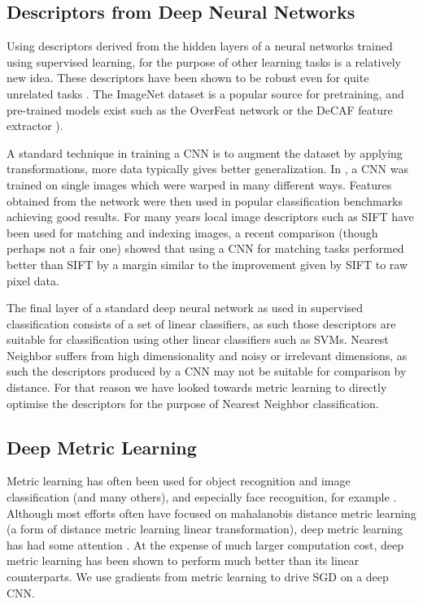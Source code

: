 \subsection {Descriptors from Deep Neural Networks}

Using descriptors derived from the hidden layers of a neural networks trained using supervised learning, for the purpose of other learning tasks is a relatively new idea. These descriptors have been shown to be robust even for quite unrelated tasks \cite{Donahue2014,Razavian2014}. The ImageNet dataset \cite{Krizhevsky2012} is a popular source for pretraining, and pre-trained models exist such as the OverFeat network \cite{Sermanet2013} or the DeCAF feature extractor \cite{Donahue2014}). 

A standard technique in training a \gls{CNN} is to augment the dataset by applying transformations, more data typically gives better generalization. In \cite{Dosovitskiy2013}, a \gls{CNN} was trained on single images which were warped in many different ways. Features obtained from the network were then used in popular classification benchmarks achieving good results. For many years local image descriptors such as \gls{SIFT} \cite{Lowe2004} have been used for matching and indexing images, a recent comparison \cite{Fischer2014} (though perhaps not a fair one) showed that using a \gls{CNN} for matching tasks performed better than \gls{SIFT} by a margin similar to the improvement given by \gls{SIFT} to raw pixel data.


The final layer of a standard deep neural network as used in supervised classification consists of a set of linear classifiers, as such those descriptors are suitable for classification using other linear classifiers such as \gls{SVM}s. Nearest Neighbor suffers from high dimensionality and noisy or irrelevant dimensions, as such the descriptors produced by a CNN may not be suitable for comparison by distance. For that reason we have looked towards metric learning to directly optimise the descriptors for the purpose of Nearest Neighbor classification. 


\subsection {Deep Metric Learning}


Metric learning has often been used for object recognition and image classification \cite{Hadsell2006,Min2009} (and many others), and especially face recognition, for example \cite{Kostinger2012}. Although most efforts often have focused on mahalanobis distance metric learning (a form of distance metric learning linear transformation), deep metric learning has had some attention \cite {Salakhutdinov2007a,Min2009,Weston2009,Min2010}. At the expense of much larger computation cost, deep metric learning has been shown to perform much better than its linear counterparts. We use gradients from metric learning to drive \gls{SGD} on a deep \gls{CNN}. 

